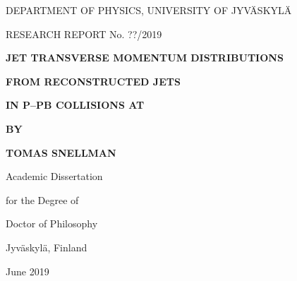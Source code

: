 



\thispagestyle{empty}
\vspace*{10mm}

\centerline{DEPARTMENT OF PHYSICS, UNIVERSITY OF JYV\"ASKYL\"A}
\centerline{RESEARCH REPORT No. ??/2019}

\vspace{25mm} 

\centerline{\bf JET TRANSVERSE MOMENTUM DISTRIBUTIONS }
\centerline{\bf  FROM RECONSTRUCTED JETS}

\centerline{\bf  IN P--PB COLLISIONS AT }
\centerline{\bf }

\vspace{13mm}


\centerline{\bf BY}
\centerline{\bf TOMAS SNELLMAN}

\vspace{13mm}

\centerline{Academic Dissertation}
\centerline{for the Degree of}
\centerline{Doctor of Philosophy}

\vspace{13mm}


\vspace{13mm}




\centerline{Jyv\"askyl\"a, Finland}
\centerline{June 2019}

\pagebreak
\thispagestyle{empty}

\vspace*{25mm} 

